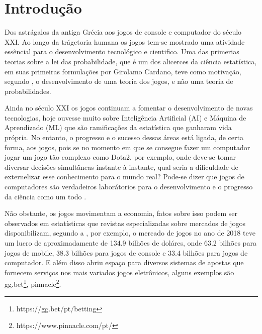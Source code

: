\documentclass[
12pt,				%
openright,			%
oneside,			%
a4paper,			%
english,			%
brazil,				%
]{abntex2}
\begin{document}

\imprimirfolhaderosto

\tableofcontents*
\cleardoublepage


\textual

\chapter{Introdução}

Dos astrágalos da antiga Grécia aos jogos de console e computador do século XXI.
Ao longo da trágetoria humana os jogos tem-se mostrado uma atividade essêncial
para o desenvolvimento tecnológico e cientifico. Uma das primerias teorias sobre
a lei das probabilidade, que é um dos alicerces da ciência estatística, em suas
primeiras formulações por Girolamo Cardano, teve como motivação, segundo
\cite{bernstein1997desafio}, o desenvolvimento de uma teoria dos jogos, e não
uma teoria de probabilidades.


Ainda no século XXI os jogos continuam a fomentar o desenvolvimento de novas
tecnologias, hoje ouvesse muito sobre Inteligência Artificial (AI) e Máquina de
Aprendizado (ML) que são ramificações da estatística que ganharam vida
própria. No entanto, o progresso e o sucesso dessas áreas está ligada, de certa
forma, aos jogos, pois se no momento em que se consegue fazer um computador
jogar um jogo tão complexo como Dota2, por exemplo, onde deve-se tomar diversar
decisões simultãneas instante à instante, qual seria a dificuldade de
externelizar esse conhecimento para o mundo real? Pode-se dizer que jogos de
computadores são verdadeiros laborátorios para o desenvolvimento e o progresso da
ciência como um todo \cite{silva2017moba}.

Não obstante, os jogos movimentam a economia, fatos sobre isso podem ser
observados em estatísticas que revistas especializadas sobre mercados de jogos
disponibilizam, segundo a \cite{newzoo2018global}, por exemplo, o mercado de
jogos no ano de 2018 teve um lucro de aproximadamente de 134.9 bilhões de
doláres, onde 63.2 bilhões para jogos de mobile, 38.3 bilhões para jogos de
console e 33.4 bilhões para jogos de computador. E além disso abriu espaço 
para diversos sistemas de apostas que fornecem serviços nos mais
variados jogos eletrônicos, alguns exemplos são
gg.bet\footnote{https://gg.bet/pt/betting},
pinnacle\footnote{https://www.pinnacle.com/pt/}.
\end{document}

